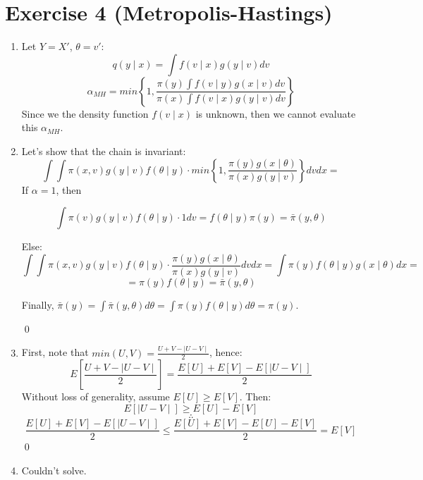 \documentclass[12pt,letterpaper]{article}
\begin{document}
\newpage
\section*{Exercise 4 (Metropolis-Hastings)}
\begin{enumerate}[leftmargin=!,labelindent=5pt]
\item Let $Y = X'$, $\theta = v'$:
$$q(y \mid x) = \int f(v \mid x) g(y \mid v) dv$$
$$
\alpha_{MH} = min \left \{ 1,
\frac{\pi(y)\int f(v \mid y) g(x \mid v) dv}
{\pi(x)\int f(v \mid x) g(y \mid v) dv}
\right \}
$$
Since we the density function $f(v \mid x)$ is unknown, then we cannot 
evaluate this $\alpha_{MH}$.

\item Let's show that the chain is invariant:
$$
\int \int \pi(x,v) g(y \mid v) f(\theta \mid y)
\cdot min \left \{
1, \frac{\pi(y)g(x \mid \theta)}{\pi(x)g(y\mid v)}
\right\} dv dx = 
$$
If $\alpha =1 $, then

$$
\int \pi(v) g(y \mid v) f(\theta \mid y)
\cdot 1
dv = f(\theta \mid y) \pi(y) = \bar\pi(y, \theta)
$$

Else:
$$
\int \int \pi(x,v) g(y \mid v) f(\theta \mid y)
\cdot 
\frac{\pi(y)g(x \mid \theta)}{\pi(x)g(y\mid v)}
dv dx = 
\int \pi(y) f(\theta \mid y) g(x \mid \theta) dx =
$$
$$
= \pi(y) f(\theta \mid y) = \bar\pi(y, \theta)
$$

Finally, $\bar\pi(y) = \int \bar\pi(y,\theta) d\theta = 
\int \pi(y) f(\theta \mid y) d\theta = \pi(y)$.

\qed

\item First, note that $min(U,V) = \frac{U+V -\mid U - V \mid}{2}$, hence:
$$
E \left[
	\frac{U + V - \mid U - V \mid}{2}
\right] = 
\frac{E[U] + E[V] - E[\mid U - V \mid] }{2}
$$
Without loss of generality, assume $E[U] \geq E[V]$. Then:
$$
E[\mid U - V \mid] \geq E[U] - E[V]
$$
$$
\therefore
$$
$$
\frac{E[U] + E[V] - E[\mid U - V \mid] }{2} \leq
\frac{E[U] + E[V] - E[U]- E[V]}{2} = E[V]
$$
\qed

\item Couldn't solve.
\end{enumerate}

\newpage
\end{document}
